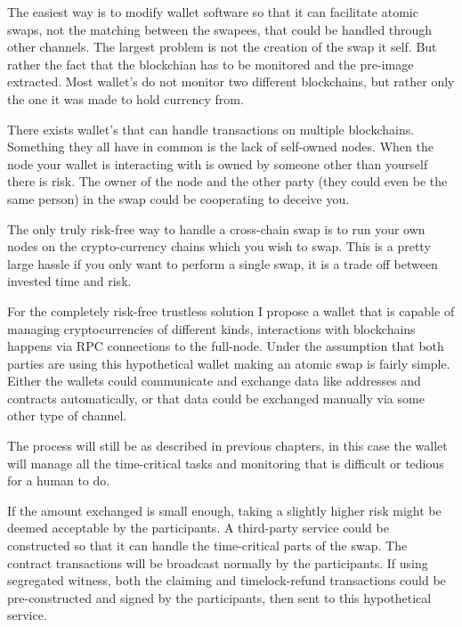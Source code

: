 The easiest way is to modify wallet software so that it can facilitate atomic swaps, not the matching between the swapees, 
that could be handled through other channels. The largest problem is not the creation of the swap it self. But rather
the fact that the blockchian has to be monitored and the pre-image extracted. Most wallet's do not monitor two different blockchains,
but rather only the one it was made to hold currency from. 

There exists wallet's that can handle transactions on multiple blockchains. Something they all have in common is the lack of self-owned
nodes. When the node your wallet is interacting with is owned by someone other than yourself there is risk. The owner of the node and
the other party (they could even be the same person) in the swap could be cooperating to deceive you. 

The only truly risk-free way to handle a cross-chain swap is to run your own nodes on the crypto-currency chains which you wish to swap.
This is a pretty large hassle if you only want to perform a single swap, it is a trade off between invested time and risk. 

For the completely risk-free trustless solution I propose a wallet that is capable of managing cryptocurrencies of different kinds, 
interactions with blockchains happens via RPC connections to the full-node. Under the assumption that both parties are using this
hypothetical wallet making an atomic swap is fairly simple. Either the wallets could communicate and exchange data like addresses 
and contracts automatically, or that data could be exchanged manually via some other type of channel.

The process will still be as described in previous chapters, in this case the wallet will manage all the time-critical tasks and 
monitoring that is difficult or tedious for a human to do.


If the amount exchanged is small enough, taking a slightly higher risk might be deemed acceptable by the participants. A third-party service could be constructed so that it can handle the time-critical parts of the swap. The contract transactions will be broadcast normally by the participants. If using segregated witness, both the claiming and timelock-refund transactions could be pre-constructed and signed by the participants, then sent to this hypothetical service.

